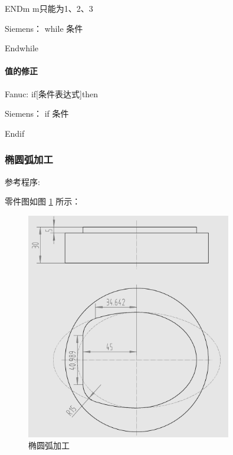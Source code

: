 ENDm    m只能为1、2、3

Siemens： while 条件

Endwhile 

\paragraph{值的修正}

Fanuc:  if[条件表达式]then

Siemens： if  条件

Endif

\subsubsection{椭圆弧加工}
参考程序:

零件图如图 \ref{椭圆弧加工} 所示：

	\begin{figure}
\centering	\includegraphics[width=0.8\textwidth]{images/5-1.jpg}
	\caption{椭圆弧加工} \label{椭圆弧加工}
\end{figure}


